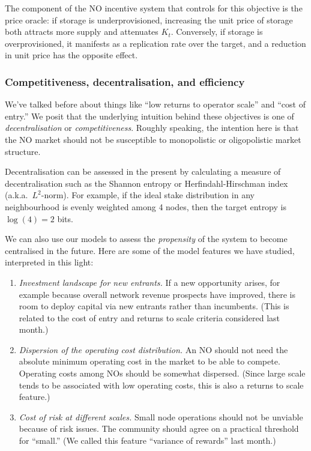 The component of the NO incentive system that controls for this objective is the price oracle: if storage is underprovisioned, increasing the unit price of storage both attracts more supply and attenuates $K_t$.
%
Conversely, if storage is overprovisioned, it manifests as a replication rate over the target, and a reduction in unit price has the opposite effect.

\subsubsection*{Competitiveness, decentralisation, and efficiency}

We've talked before about things like ``low returns to operator scale'' and ``cost of entry.'' We posit that the underlying intuition behind these objectives is one of \emph{decentralisation} or \emph{competitiveness}.
%
Roughly speaking, the intention here is that the NO market should not be susceptible to monopolistic or oligopolistic market structure.

Decentralisation can be assessed in the present by calculating a measure of decentralisation such as the Shannon entropy or Herfindahl-Hirschman index (a.k.a.~$L^2$-norm).
%
For example, if the ideal stake distribution in any neighbourhood is evenly weighted among 4 nodes, then the target entropy is $\log(4)=2$ bits.

We can also use our models to assess the \emph{propensity} of the system to become centralised in the future.
%
Here are some of the model features we have studied, interpreted in this light:
\begin{enumerate}
  \item \emph{Investment landscape for new entrants.} If a new opportunity arises, for example because overall network revenue prospects have improved, there is room to deploy capital via new entrants rather than incumbents. (This is related to the cost of entry and returns to scale criteria considered last month.)
  \item \emph{Dispersion of the operating cost distribution.} An NO should not need the absolute minimum operating cost in the market to be able to compete. Operating costs among NOs should be somewhat dispersed. (Since large scale tends to be associated with low operating costs, this is also a returns to scale feature.) 
  \item \emph{Cost of risk at different scales.} Small node operations should not be unviable because of risk issues. The community should agree on a practical threshold for ``small.'' (We called this feature ``variance of rewards'' last month.)
\end{enumerate}

